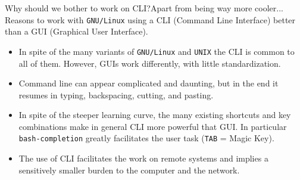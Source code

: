 \begin{frame}{Why should we bother to work on CLI?}{Apart from being way more cooler...}
   { Reasons to work with \texttt{GNU/Linux} using a \alert{CLI} (Command Line Interface) better than a GUI (Graphical User Interface).}
   \begin{itemize}
   \item {\small In spite of the many variants of  \texttt{GNU/Linux} and  \texttt{UNIX} the CLI is \alert{common to all of them}. However,  GUIs work differently, with little standardization.}
     
   \item {\small  Command line can appear complicated and daunting, but in the end it resumes in typing, backspacing, cutting, and pasting.}
     
   \item {\small   In spite of the steeper learning curve, the many existing shortcuts and key combinations make in general CLI more powerful that GUI. In particular \texttt{bash-completion} greatly facilitates the user task (\alert{\texttt{TAB}} = Magic Key).}

   \item {\small  The use of CLI facilitates the work on remote systems and implies a sensitively smaller burden to the computer and the network.
     }
  \end{itemize}
\end{frame}
